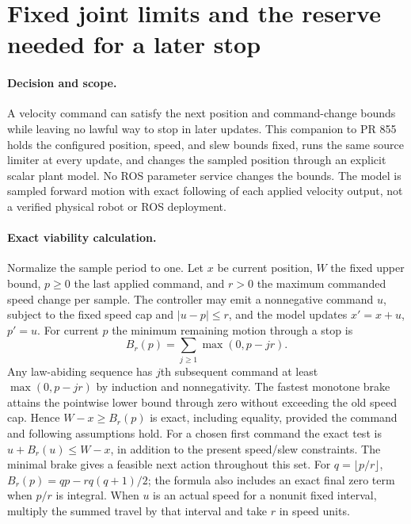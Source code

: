 \documentclass{article}
\begin{document}
\section*{Fixed joint limits and the reserve needed for a later stop}

\paragraph{Decision and scope.}
A velocity command can satisfy the next position and command-change
bounds while leaving no lawful way to stop in later updates. This
companion to PR 855 holds the configured position, speed, and slew
bounds fixed, runs the same source limiter at every update, and
changes the sampled position through an explicit scalar plant
model. No ROS parameter service changes the bounds. The model
is sampled forward motion with exact following of each applied
velocity output, not a verified physical robot or ROS deployment.

\paragraph{Exact viability calculation.}
Normalize the sample period to one. Let $x$ be current position,
$W$ the fixed upper bound, $p\ge0$ the last applied command, and
$r>0$ the maximum commanded speed change per sample. The controller
may emit a nonnegative command $u$, subject to the fixed speed cap
and $|u-p|\le r$, and the model updates $x'=x+u$, $p'=u$.
For current $p$ the minimum remaining motion through a stop is
\[
  B_r(p)=\sum_{j\ge1}\max(0,p-jr).
\]
Any law-abiding sequence has $j$th subsequent command at least
$\max(0,p-jr)$ by induction and nonnegativity. The fastest monotone
brake attains the pointwise lower bound through zero without
exceeding the old speed cap. Hence $W-x\ge B_r(p)$ is exact,
including equality, provided the command and following assumptions
hold. For a chosen first command the exact test is
$u+B_r(u)\le W-x$, in addition to the present speed/slew constraints.
The minimal brake gives a feasible next action throughout this set.
For $q=\lfloor p/r\rfloor$, $B_r(p)=qp-rq(q+1)/2$; the formula
also includes an exact final zero term when $p/r$ is integral.
When $u$ is an actual speed for a nonunit fixed interval, multiply
the summed travel by that interval and take $r$ in speed units.
\end{document}
